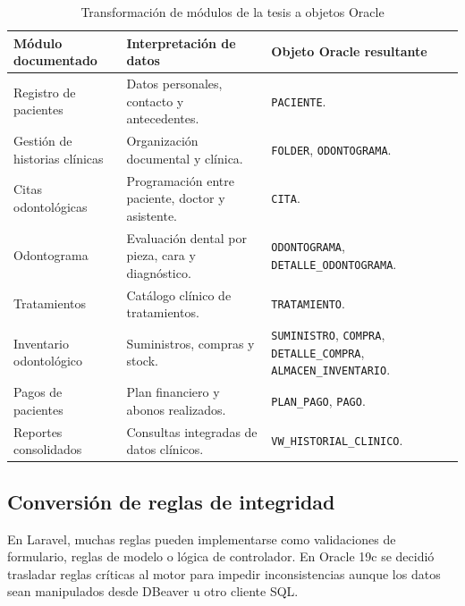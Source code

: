 \begin{table}[H]
\caption{Transformación de módulos de la tesis a objetos Oracle}
\centering
\small
\begin{tabularx}{\textwidth}{L{0.30\textwidth}Y Y}
\toprule
\textbf{Módulo documentado} & \textbf{Interpretación de datos} & \textbf{Objeto Oracle resultante} \\
\midrule
Registro de pacientes & Datos personales, contacto y antecedentes. & \texttt{PACIENTE}. \\
Gestión de historias clínicas & Organización documental y clínica. & \texttt{FOLDER}, \texttt{ODONTOGRAMA}. \\
Citas odontológicas & Programación entre paciente, doctor y asistente. & \texttt{CITA}. \\
Odontograma & Evaluación dental por pieza, cara y diagnóstico. & \texttt{ODONTOGRAMA}, \texttt{DETALLE\_ODONTOGRAMA}. \\
Tratamientos & Catálogo clínico de tratamientos. & \texttt{TRATAMIENTO}. \\
Inventario odontológico & Suministros, compras y stock. & \texttt{SUMINISTRO}, \texttt{COMPRA}, \texttt{DETALLE\_COMPRA}, \texttt{ALMACEN\_INVENTARIO}. \\
Pagos de pacientes & Plan financiero y abonos realizados. & \texttt{PLAN\_PAGO}, \texttt{PAGO}. \\
Reportes consolidados & Consultas integradas de datos clínicos. & \texttt{VW\_HISTORIAL\_CLINICO}. \\
\bottomrule
\end{tabularx}
\end{table}

\subsection{Conversión de reglas de integridad}

En Laravel, muchas reglas pueden implementarse como validaciones de formulario, reglas de modelo o lógica de controlador. En Oracle 19c se decidió trasladar reglas críticas al motor para impedir inconsistencias aunque los datos sean manipulados desde DBeaver u otro cliente SQL.

